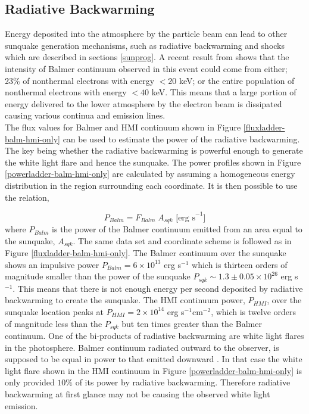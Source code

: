 \subsection{Radiative Backwarming}
Energy deposited into the atmosphere by the particle beam can lead to other sunquake generation mechanisms, such as radiative backwarming and shocks which are described in sections \ref{sunprog}. A recent result from \cite{2016ApJ...816...88K} shows that the intensity of Balmer continuum observed in this event could come from either; 23\% of nonthermal electrons with energy $<20$ keV; or the entire population of nonthermal electrons with energy $<40$ keV. This means that a large portion of energy delivered to the lower atmosphere by the electron beam is dissipated causing various continua and emission lines. \\
\noindent
The flux values for Balmer and HMI continuum shown in Figure \ref{fluxladder-balm-hmi-only} can be used to estimate the power of the radiative backwarming. The key being whether the radiative backwarming is powerful enough to generate the white light flare and hence the sunquake. The power profiles shown in Figure \ref{powerladder-balm-hmi-only} are calculated by assuming a homogeneous energy distribution in the region surrounding each coordinate. It is then possible to use the relation,

\begin{equation}
P_{Balm} = F_{Balm} \; A_{sqk}  \text{ [erg s}^{-1}]
\end{equation}\label{Pbalm}
\noindent
where $P_{Balm}$ is the power of the Balmer continuum emitted from an area equal to the sunquake, $A_{sqk}$. The same data set and coordinate scheme is followed as in Figure \ref{fluxladder-balm-hmi-only}. The Balmer continuum over the sunquake shows an impulsive power $P_{Balm} = 6{\times}10^{13}$ erg s$^{-1}$ which is thirteen orders of magnitude smaller than the power of the sunquake $P_{sqk} \sim 1.3\pm0.05{\times}10^{26}$ erg s$^{-1}$. This means that there is not enough energy per second deposited by radiative backwarming to create the sunquake. The HMI continuum power, $P_{HMI}$, over the sunquake location peaks at $P_{HMI} = 2{\times}10^{14}$ erg s$^{-1}$cm$^{-2}$, which is twelve orders of magnitude less than the $P_{sqk}$ but ten times greater than the Balmer continuum. One of the bi-products of radiative backwarming are white light flares in the photosphere. Balmer continuum radiated outward to the observer, is supposed to be equal in power to that emitted downward \citep{1989SoPh..124..303M}. In that case the white light flare shown in the HMI continuum in Figure \ref{powerladder-balm-hmi-only} is only provided $10\%$ of its power by radiative backwarming. Therefore radiative backwarming at first glance may not be causing the observed white light emission.

